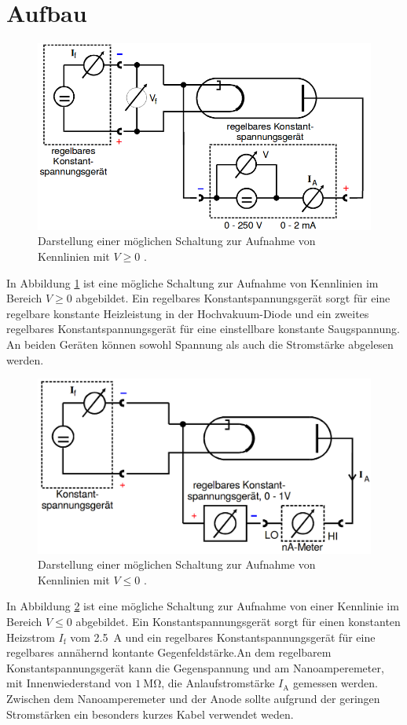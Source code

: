 \section{Aufbau}
\label{sec:Aufbau}
\begin{figure}
	\centering
	\includegraphics[width=\linewidth-100pt,height=\textheight-100pt,keepaspectratio]{content/Bilder/Schaltung1.png}
	\caption{Darstellung einer möglichen Schaltung zur Aufnahme von Kennlinien mit $V\ge0$ \cite{V504}.}
	\label{fig:Schaltung1}
\end{figure}
In Abbildung \ref{fig:Schaltung1} ist eine mögliche Schaltung zur Aufnahme von Kennlinien im Bereich $V\ge 0$ abgebildet. Ein regelbares Konstantspannungsgerät sorgt für eine regelbare konstante Heizleistung in der Hochvakuum-Diode und ein zweites regelbares Konstantspannungsgerät für eine einstellbare konstante Saugspannung. An beiden Geräten können sowohl Spannung als auch die Stromstärke abgelesen werden.
\begin{figure}
	\centering
	\includegraphics[width=\linewidth-100pt,height=\textheight-100pt,keepaspectratio]{content/Bilder/Schaltung2.png}
	\caption{Darstellung einer möglichen Schaltung zur Aufnahme von Kennlinien mit $V\le0$ \cite{V504}.}
	\label{fig:Schaltung2}
\end{figure}
In Abbildung \ref{fig:Schaltung2} ist eine mögliche Schaltung zur Aufnahme von einer Kennlinie im Bereich $V\le0$ abgebildet. Ein Konstantspannungsgerät sorgt für einen konstanten Heizstrom $I_\text{f}$ vom \SI{2.5}{\ampere} und ein regelbares Konstantspannungsgerät für eine regelbares annähernd kontante Gegenfeldstärke.An dem regelbarem Konstantspannungsgerät kann die Gegenspannung und am Nanoamperemeter, mit Innenwiederstand von $\SI{1}{\mega\ohm}$, die Anlaufstromstärke $I_\text{A}$ gemessen werden. Zwischen dem Nanoamperemeter und der Anode sollte aufgrund der geringen Stromstärken ein besonders kurzes Kabel verwendet weden.

